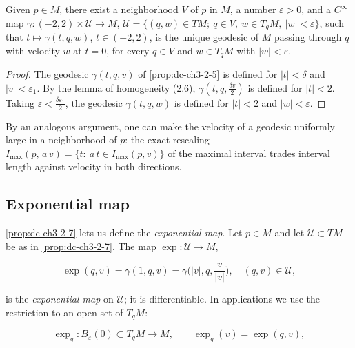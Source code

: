 \begin{proposition}
  \label{prop:dc-ch3-2-7}
  \notready
  Given $p\in M$, there exist a neighborhood $V$ of $p$ in $M$, a number
  $\varepsilon>0$, and a $C^\infty$ map $\gamma:(-2,2)\times\mathcal{U}\to M$,
  $\mathcal{U}=\{(q,w)\in TM;\ q\in V,\ w\in T_qM,\ |w|<\varepsilon\}$, such that
  $t\mapsto\gamma(t,q,w)$, $t\in(-2,2)$, is the unique geodesic of $M$ passing
  through $q$ with velocity $w$ at $t=0$, for every $q\in V$ and $w\in T_qM$ with
  $|w|<\varepsilon$.
\end{proposition}
\begin{proof}
  \sketch
  The geodesic $\gamma(t,q,v)$ of \cref{prop:dc-ch3-2-5} is defined for
  $|t|<\delta$ and $|v|<\varepsilon_1$. By the lemma of homogeneity (2.6),
  $\gamma(t,q,\frac{\delta v}{2})$ is defined for $|t|<2$. Taking
  $\varepsilon<\frac{\delta\varepsilon_1}{2}$, the geodesic $\gamma(t,q,w)$ is
  defined for $|t|<2$ and $|w|<\varepsilon$.
\end{proof}

\begin{remark}
  \label{rem:dc-ch3-2-8}
  \leanok
  By an analogous argument, one can make the velocity of a geodesic uniformly large
  in a neighborhood of $p$: the exact rescaling
  $I_{\max}(p,\,a\,v)=\{t:\ a\,t\in I_{\max}(p,v)\}$ of the maximal interval
  trades interval length against velocity in both directions.
\end{remark}

\subsection{Exponential map}
\cref{prop:dc-ch3-2-7} lets us define the \emph{exponential map}. Let $p\in M$ and let
$\mathcal{U}\subset TM$ be as in \cref{prop:dc-ch3-2-7}. The map $\exp:\mathcal{U}\to M$,

$$
\exp(q,v)=\gamma(1,q,v)=\gamma\Big(|v|,q,\frac{v}{|v|}\Big),\quad(q,v)\in\mathcal{U},
$$

is the \emph{exponential map} on $\mathcal{U}$; it is differentiable. In applications
we use the restriction to an open set of $T_qM$:

$$
\exp_q:B_\varepsilon(0)\subset T_qM\to M,\qquad\exp_q(v)=\exp(q,v),
$$

